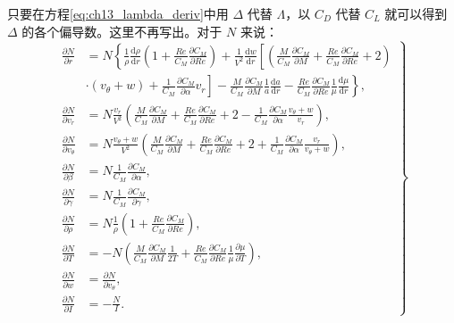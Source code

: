 只要在方程\eqref{eq:ch13_lambda_deriv}中用 $\Delta$ 代替 $\Lambda$，以 $C_D$ 代替 $C_L$ 就可以得到 $\Delta$ 的各个偏导数。这里不再写出。对于 $N$ 来说：
\begin{equation}\label{eq:ch13_N_deriv}
\left.
\begin{aligned}
\frac{\partial N}{\partial r} &= N \left\{ \frac{1}{\rho} \frac{\mathrm{d}\rho}{\mathrm{d}r} \left( 1 + \frac{Re}{C_M} \frac{\partial C_M}{\partial Re} \right) + \frac{1}{V^2} \frac{\mathrm{d}w}{\mathrm{d}r} \left[ \left( \frac{M}{C_M} \frac{\partial C_M}{\partial M} + \frac{Re}{C_M} \frac{\partial C_M}{\partial Re} + 2 \right)\right.\right.\\
& \left.\left. \cdot (v_\theta + w) + \frac{1}{C_M} \frac{\partial C_M}{\partial \alpha} v_r \right] - \frac{M}{C_M} \frac{\partial C_M}{\partial M} \frac{1}{a} \frac{\mathrm{d}a}{\mathrm{d}r} - \frac{Re}{C_M} \frac{\partial C_M}{\partial Re} \frac{1}{\mu} \frac{\mathrm{d}\mu}{\mathrm{d}r} \right\}, \\
\frac{\partial N}{\partial v_r} &= N \frac{v_r}{V^2} \left( \frac{M}{C_M} \frac{\partial C_M}{\partial M} + \frac{Re}{C_M} \frac{\partial C_M}{\partial Re} + 2 - \frac{1}{C_M} \frac{\partial C_M}{\partial \alpha} \frac{v_\theta + w}{v_r} \right), \\
\frac{\partial N}{\partial v_\theta} &= N \frac{v_\theta + w}{V^2} \left( \frac{M}{C_M} \frac{\partial C_M}{\partial M} + \frac{Re}{C_M} \frac{\partial C_M}{\partial Re} + 2 + \frac{1}{C_M} \frac{\partial C_M}{\partial \alpha} \frac{v_r}{v_\theta + w} \right), \\
\frac{\partial N}{\partial \beta} &= N \frac{1}{C_M} \frac{\partial C_M}{\partial \alpha}, \\
\frac{\partial N}{\partial \gamma} &= N \frac{1}{C_M} \frac{\partial C_M}{\partial \gamma}, \\
\frac{\partial N}{\partial \rho} &= N \frac{1}{\rho} \left( 1 + \frac{Re}{C_M} \frac{\partial C_M}{\partial Re} \right), \\
\frac{\partial N}{\partial T} &= -N \left( \frac{M}{C_M} \frac{\partial C_M}{\partial M} \frac{1}{2T} + \frac{Re}{C_M} \frac{\partial C_M}{\partial Re} \frac{1}{\mu} \frac{\partial \mu}{\partial T} \right), \\
\frac{\partial N}{\partial w} &= \frac{\partial N}{\partial v_\theta}, \\
\frac{\partial N}{\partial I} &= -\frac{N}{I}.
\end{aligned}
\right\}
\end{equation}

